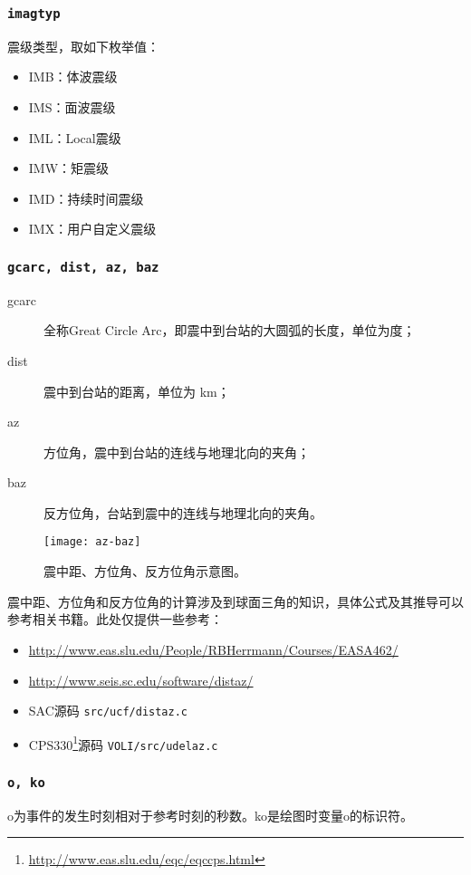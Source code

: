 \subsubsection{\texttt{imagtyp}}
震级类型，取如下枚举值：
\begin{itemize}
\ttfamily
\item IMB：体波震级
\item IMS：面波震级
\item IML：Local震级
\item IMW：矩震级
\item IMD：持续时间震级
\item IMX：用户自定义震级
\end{itemize}

\subsubsection{\texttt{gcarc, dist, az, baz}}
\begin{description}
\item [gcarc] 全称Great Circle Arc，即震中到台站的大圆弧的长度，单位为度；
\item [dist] 震中到台站的距离，单位为 \si{\km}；
\item [az] 方位角，震中到台站的连线与地理北向的夹角；
\item [baz] 反方位角，台站到震中的连线与地理北向的夹角。
\end{description}

\begin{figure}[H]
\centering
\texttt{[image: az-baz]}
\caption[震中距、方位角、反方位角示意图]{震中距、方位角、反方位角示意图。}
\label{fig:gcarc-dist-az-baz}
\end{figure}

震中距、方位角和反方位角的计算涉及到球面三角的知识，具体公式及其推导可以参考相关书籍。此处仅提供一些参考：

\begin{itemize}
\item \url{http://www.eas.slu.edu/People/RBHerrmann/Courses/EASA462/}
\item \url{http://www.seis.sc.edu/software/distaz/}
\item SAC源码 \texttt{src/ucf/distaz.c}
\item CPS330\footnote{\url{http://www.eas.slu.edu/eqc/eqccps.html}}源码 \texttt{VOLI/src/udelaz.c}
\end{itemize}

\subsubsection{\texttt{o, ko}}
o为事件的发生时刻相对于参考时刻的秒数。ko是绘图时变量o的标识符。

